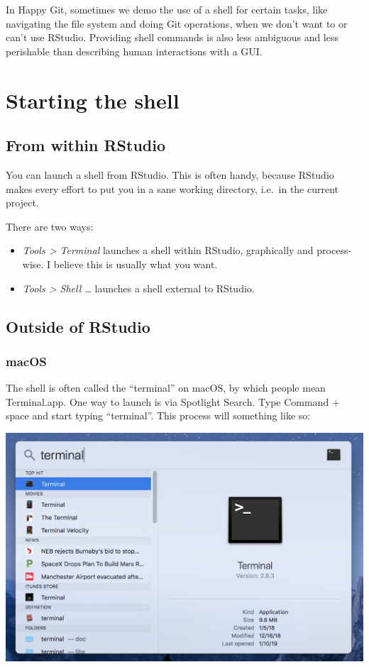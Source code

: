 \documentclass[
]{book}
\providecommand{\tightlist}{%
  \setlength{\itemsep}{0pt}\setlength{\parskip}{0pt}}
\begin{document}
In Happy Git, sometimes we demo the use of a shell for certain tasks, like navigating the file system and doing Git operations, when we don't want to or can't use RStudio. Providing shell commands is also less ambiguous and less perishable than describing human interactions with a GUI.

\section{Starting the shell}\label{starting-the-shell}

\subsection{From within RStudio}\label{from-within-rstudio}

You can launch a shell from RStudio. This is often handy, because RStudio makes every effort to put you in a sane working directory, i.e.~in the current project.

There are two ways:

\begin{itemize}
\tightlist
\item
  \emph{Tools \textgreater{} Terminal} launches a shell within RStudio, graphically and process-wise. I believe this is usually what you want.
\item
  \emph{Tools \textgreater{} Shell \ldots{}} launches a shell external to RStudio.
\end{itemize}

\subsection{Outside of RStudio}\label{outside-of-rstudio}

\subsubsection{macOS}\label{macos-1}

The shell is often called the ``terminal'' on macOS, by which people mean Terminal.app. One way to launch is via Spotlight Search. Type Command + space and start typing ``terminal''. This process will something like so:

\includegraphics{img/terminal_mac_search.png}
\end{document}
